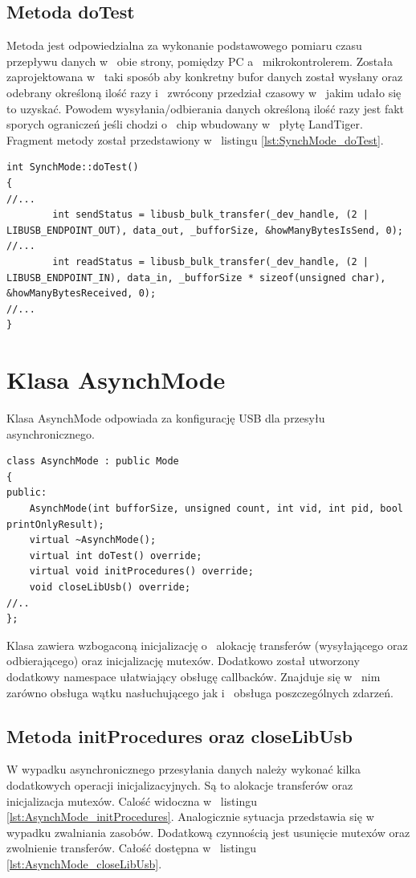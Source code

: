 \documentclass{BscUS}
\begin{document}
\subsection{Metoda doTest}
Metoda jest odpowiedzialna za wykonanie podstawowego pomiaru czasu przepływu danych w~ obie strony, pomiędzy PC a~ mikrokontrolerem.
Została zaprojektowana w~ taki sposób aby konkretny bufor danych został wysłany oraz odebrany określoną ilość razy i~ zwrócony przedział czasowy w~ jakim udało się to uzyskać. Powodem wysyłania/odbierania danych określoną ilość razy jest fakt sporych ograniczeń jeśli chodzi o~ chip wbudowany w~ płytę LandTiger. Fragment metody został przedstawiony w~ listingu \ref{lst:SynchMode_doTest}.
\begin{lstlisting}[caption={Fragment metody SynchMode::doTest().},label={lst:SynchMode_doTest}]
int SynchMode::doTest()
{
//...
		int sendStatus = libusb_bulk_transfer(_dev_handle, (2 | LIBUSB_ENDPOINT_OUT), data_out, _bufforSize, &howManyBytesIsSend, 0); 
//...		
		int readStatus = libusb_bulk_transfer(_dev_handle, (2 | LIBUSB_ENDPOINT_IN), data_in, _bufforSize * sizeof(unsigned char), &howManyBytesReceived, 0);
//...
}
\end{lstlisting}
\section{Klasa AsynchMode}
Klasa AsynchMode odpowiada za konfigurację USB dla przesyłu asynchronicznego. 

\begin{lstlisting}[caption={Deklaracja klasy AsynchMode.},label={lst:CAsynchMode}]
class AsynchMode : public Mode
{
public:
	AsynchMode(int bufforSize, unsigned count, int vid, int pid, bool printOnlyResult);
	virtual ~AsynchMode();
	virtual int doTest() override;
	virtual void initProcedures() override;
	void closeLibUsb() override;
//..
};
\end{lstlisting}
Klasa zawiera wzbogaconą inicjalizację o~ alokację transferów (wysyłającego oraz odbierającego) oraz inicjalizację mutexów.
Dodatkowo został utworzony dodatkowy namespace ułatwiający obsługę callbacków. Znajduje się w~ nim zarówno obsługa wątku nasłuchującego jak i~ obsługa poszczególnych zdarzeń.
\subsection{Metoda initProcedures oraz closeLibUsb}
W wypadku asynchronicznego przesyłania danych należy wykonać kilka dodatkowych operacji inicjalizacyjnych. Są to alokacje transferów oraz inicjalizacja mutexów.
Calość widoczna w~ listingu \ref{lst:AsynchMode_initProcedures}.
Analogicznie sytuacja przedstawia się w~ wypadku zwalniania zasobów. Dodatkową czynnością jest usunięcie mutexów oraz zwolnienie transferów. Całość dostępna w~ listingu \ref{lst:AsynchMode_closeLibUsb}.
\end{document}
